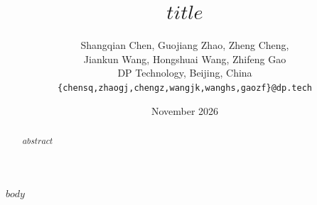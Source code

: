 \documentclass[11pt,a4paper]{article}
\title{\textbf{$title$}}
\author{Shangqian Chen, Guojiang Zhao, Zheng Cheng,\\
Jiankun Wang, Hongshuai Wang, Zhifeng Gao\\[3pt]
\small DP Technology, Beijing, China\\
\small\texttt{\{chensq,zhaogj,chengz,wangjk,wanghs,gaozf\}@dp.tech}}
\date{November 2026}
\begin{document}
\maketitle
\begin{abstract}
$abstract$
\end{abstract}
\setcounter{figure}{-1}
$body$
\begingroup
\small
\raggedright

\endgroup
\end{document}

